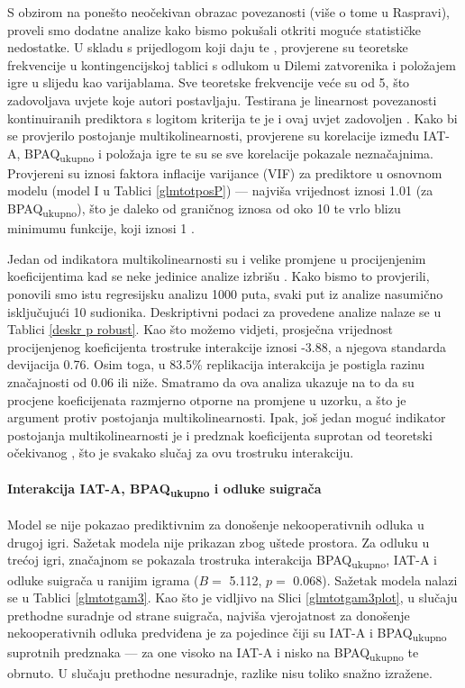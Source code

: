 \documentclass[a4paper, 12pt]{report}
\begin{document}
S obzirom na ponešto neočekivan obrazac povezanosti (više o tome u Raspravi),
proveli smo dodatne analize kako bismo pokušali otkriti moguće
statističke nedostatke. U skladu s prijedlogom koji daju \citet{fieldr} te
\citet{tabachnick2012multi}, provjerene su
teoretske frekvencije u kontingencijskoj tablici s odlukom u Dilemi zatvorenika i 
položajem igre u slijedu kao varijablama. Sve teoretske frekvencije veće su od
5, što zadovoljava uvjete koje autori postavljaju.
Testirana je linearnost povezanosti kontinuiranih prediktora s logitom
kriterija te je i ovaj uvjet zadovoljen \citep{fieldr, jaccard2001interaction}.
Kako bi se provjerilo postojanje multikolinearnosti, provjerene su korelacije
između IAT-A, BPAQ\textsubscript{ukupno} i položaja igre te su se sve korelacije
pokazale neznačajnima. Provjereni su iznosi faktora inflacije varijance (VIF) za
prediktore u osnovnom modelu (model I u Tablici \ref{glmtotposP}) --- 
najviša vrijednost iznosi 1.01 (za
BPAQ\textsubscript{ukupno}), što je daleko od graničnog iznosa od oko 10 te
vrlo blizu minimumu funkcije, koji iznosi 1
\citep{james2013introduction, fieldr, salkind2007encyclopedia}. 

Jedan od indikatora multikolinearnosti su i velike  promjene u procijenjenim
koeficijentima kad se neke jedinice analize izbrišu
\citep{salkind2007encyclopedia}. Kako bismo to provjerili, ponovili smo istu
regresijsku analizu 1000 puta, svaki put iz analize nasumično isključujući 10
sudionika. Deskriptivni podaci za provedene analize nalaze se u Tablici
\ref{deskr p robust}. Kao što možemo vidjeti, prosječna vrijednost procijenjenog
koeficijenta trostruke interakcije iznosi -3.88, a njegova standarda devijacija
0.76. Osim toga, u 83.5\% replikacija interakcija je postigla razinu
značajnosti od 0.06 ili niže. Smatramo da ova analiza ukazuje na to da su
procjene koeficijenata razmjerno otporne na promjene u uzorku, a što je argument
protiv postojanja multikolinearnosti.
Ipak, još jedan moguć
indikator postojanja multikolinearnosti je i predznak koeficijenta suprotan od teoretski
očekivanog \citep{salkind2007encyclopedia}, što je svakako slučaj za ovu trostruku interakciju.

\paragraph{Interakcija IAT-A, BPAQ\textsubscript{ukupno} i odluke suigrača} 
Model se nije pokazao prediktivnim za donošenje nekooperativnih odluka u drugoj
igri. Sažetak modela nije prikazan zbog uštede prostora. 
Za odluku u trećoj igri, značajnom se pokazala trostruka interakcija
BPAQ\textsubscript{ukupno}, IAT-A i odluke suigrača u ranijim igrama ($B =$
5.112, $p =$ 0.068). Sažetak modela nalazi se u Tablici \ref{glmtotgam3}. Kao
što je vidljivo na Slici \ref{glmtotgam3plot}, u slučaju prethodne suradnje od
strane suigrača, najviša vjerojatnost za donošenje nekooperativnih odluka
predviđena je za pojedince čiji su IAT-A i BPAQ\textsubscript{ukupno} suprotnih
predznaka --- za one visoko na IAT-A i nisko na BPAQ\textsubscript{ukupno} te
obrnuto. U slučaju prethodne nesuradnje, razlike nisu toliko snažno izražene.
\end{document}
